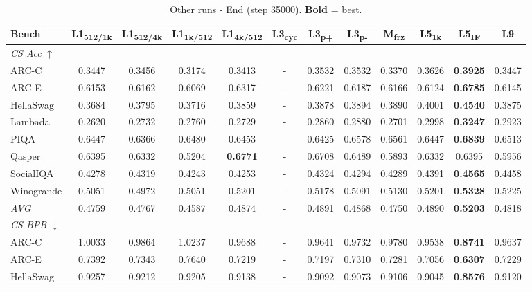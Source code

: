 \begin{table}[htbp]
\centering
\setlength{\tabcolsep}{2.5pt}
\small
\caption{Other runs - End (step 35000). \textbf{Bold} = best.}
\label{tab:other_end}
\begin{tabular}{lccccccccccc}
\toprule
Bench & L1\textsubscript{512/1k} & L1\textsubscript{512/4k} & L1\textsubscript{1k/512} & L1\textsubscript{4k/512} & L3\textsubscript{cyc} & L3\textsubscript{p+} & L3\textsubscript{p-} & M\textsubscript{frz} & L5\textsubscript{1k} & L5\textsubscript{IF} & L9 \\
\midrule
\multicolumn{12}{l}{\textit{CS Acc} $\uparrow$} \\
ARC-C & 0.3447 & 0.3456 & 0.3174 & 0.3413 & - & 0.3532 & 0.3532 & 0.3370 & 0.3626 & \textbf{0.3925} & 0.3447 \\
ARC-E & 0.6153 & 0.6162 & 0.6069 & 0.6317 & - & 0.6221 & 0.6187 & 0.6166 & 0.6124 & \textbf{0.6785} & 0.6145 \\
HellaSwag & 0.3684 & 0.3795 & 0.3716 & 0.3859 & - & 0.3878 & 0.3894 & 0.3890 & 0.4001 & \textbf{0.4540} & 0.3875 \\
Lambada & 0.2620 & 0.2732 & 0.2760 & 0.2729 & - & 0.2860 & 0.2880 & 0.2701 & 0.2998 & \textbf{0.3247} & 0.2923 \\
PIQA & 0.6447 & 0.6366 & 0.6480 & 0.6453 & - & 0.6425 & 0.6578 & 0.6561 & 0.6447 & \textbf{0.6839} & 0.6513 \\
Qasper & 0.6395 & 0.6332 & 0.5204 & \textbf{0.6771} & - & 0.6708 & 0.6489 & 0.5893 & 0.6332 & 0.6395 & 0.5956 \\
SocialIQA & 0.4278 & 0.4319 & 0.4243 & 0.4253 & - & 0.4324 & 0.4294 & 0.4289 & 0.4391 & \textbf{0.4565} & 0.4458 \\
Winogrande & 0.5051 & 0.4972 & 0.5051 & 0.5201 & - & 0.5178 & 0.5091 & 0.5130 & 0.5201 & \textbf{0.5328} & 0.5225 \\
\textit{AVG} & 0.4759 & 0.4767 & 0.4587 & 0.4874 & - & 0.4891 & 0.4868 & 0.4750 & 0.4890 & \textbf{0.5203} & 0.4818 \\
\midrule
\multicolumn{12}{l}{\textit{CS BPB} $\downarrow$} \\
ARC-C & 1.0033 & 0.9864 & 1.0237 & 0.9688 & - & 0.9641 & 0.9732 & 0.9780 & 0.9538 & \textbf{0.8741} & 0.9637 \\
ARC-E & 0.7392 & 0.7343 & 0.7640 & 0.7219 & - & 0.7197 & 0.7310 & 0.7281 & 0.7056 & \textbf{0.6307} & 0.7229 \\
HellaSwag & 0.9257 & 0.9212 & 0.9205 & 0.9138 & - & 0.9092 & 0.9073 & 0.9106 & 0.9045 & \textbf{0.8576} & 0.9120 \\

\end{tabular}
\end{table}
